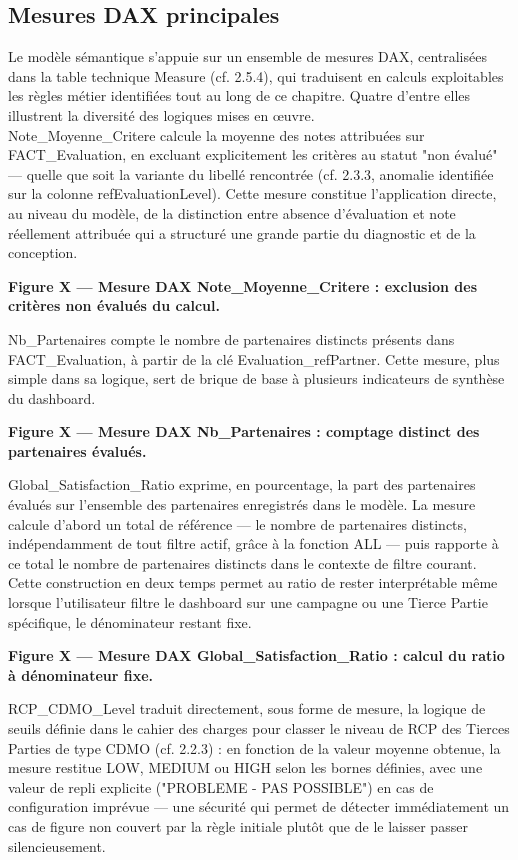 \subsection{ Mesures DAX principales}

Le modèle sémantique s'appuie sur un ensemble de mesures DAX, centralisées dans la 
table technique Measure (cf. 2.5.4), qui traduisent en calculs exploitables les règles métier 
identifiées tout au long de ce chapitre. Quatre d'entre elles illustrent la diversité des logiques 
mises en œuvre. \\

Note\_Moyenne\_Critere calcule la moyenne des notes attribuées sur FACT\_Evaluation, 
en excluant explicitement les critères au statut "non évalué" — quelle que soit la variante du 
libellé rencontrée (cf. 2.3.3, anomalie identifiée sur la colonne refEvaluationLevel). Cette 
mesure constitue l'application directe, au niveau du modèle, de la distinction entre absence 
d'évaluation et note réellement attribuée qui a structuré une grande partie du diagnostic et de 
la conception.

\textbf{Figure X — Mesure DAX Note\_Moyenne\_Critere : exclusion des critères non évalués du calcul.}

Nb\_Partenaires compte le nombre de partenaires distincts présents dans 
FACT\_Evaluation, à partir de la clé Evaluation\_refPartner. Cette mesure, plus simple dans 
sa logique, sert de brique de base à plusieurs indicateurs de synthèse du dashboard.

\textbf{Figure X — Mesure DAX Nb\_Partenaires : comptage distinct des partenaires évalués.}

Global\_Satisfaction\_Ratio exprime, en pourcentage, la part des partenaires évalués sur 
l'ensemble des partenaires enregistrés dans le modèle. La mesure calcule d'abord un total 
de référence — le nombre de partenaires distincts, indépendamment de tout filtre actif, grâce 
à la fonction ALL — puis rapporte à ce total le nombre de partenaires distincts dans le 
contexte de filtre courant. Cette construction en deux temps permet au ratio de rester 
interprétable même lorsque l'utilisateur filtre le dashboard sur une campagne ou une Tierce 
Partie spécifique, le dénominateur restant fixe.

\textbf{Figure X — Mesure DAX Global\_Satisfaction\_Ratio : calcul du ratio à dénominateur fixe.}

RCP\_CDMO\_Level traduit directement, sous forme de mesure, la logique de seuils 
définie dans le cahier des charges pour classer le niveau de RCP des Tierces Parties de 
type CDMO (cf. 2.2.3) : en fonction de la valeur moyenne obtenue, la mesure restitue LOW, 
MEDIUM ou HIGH selon les bornes définies, avec une valeur de repli explicite ("PROBLEME - PAS POSSIBLE") en cas de configuration imprévue — une sécurité qui permet de détecter 
immédiatement un cas de figure non couvert par la règle initiale plutôt que de le laisser 
passer silencieusement.

